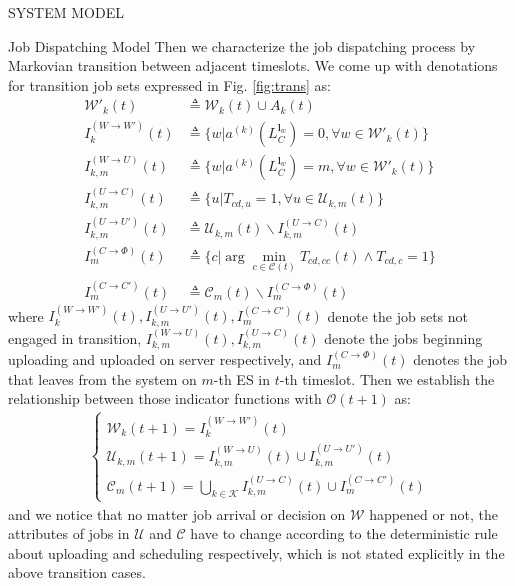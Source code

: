 \documentclass[10pt, conference, letterpaper]{IEEEtran}
\newcommand{\eq}{=}
\renewcommand{\vec}{\mathbf}
\newcommand{\apSet}{\mathcal{K}}
\newcommand{\wSet}{\mathcal{W}}
\newcommand{\uSet}{\mathcal{U}}
\newcommand{\cSet}{\mathcal{C}}
\begin{document}
\begin{section}{SYSTEM MODEL}
\begin{subsection}{Job Dispatching Model}
            Then we characterize the job dispatching process by Markovian transition between adjacent timeslots.
            We come up with denotations for transition job sets expressed in Fig. \ref{fig:trans} as:
            \begin{align}
                \wSet'_{k}(t) &\triangleq \wSet_{k}(t) \cup A_k(t)
                \\
                I^{(W \to W')}_{k}(t) & \triangleq \{ w | a^{(k)}(L_C^{\vec{l}_w})\eq0, \forall w \in \wSet'_{k}(t) \}
                \\
                I^{(W \to U)}_{k,m}(t) &\triangleq \{ w | a^{(k)}(L_C^{\vec{l}_w})=m, \forall w \in \wSet'_{k}(t) \}
                \\
                I^{(U \to C)}_{k,m}(t) &\triangleq \{ u | T_{cd,u}=1, \forall u \in \uSet_{k,m}(t)\}
                \\
                I^{(U \to U')}_{k,m}(t) &\triangleq \uSet_{k,m}(t) \backslash I^{(U \to C)}_{k,m}(t)
                \\
                I^{(C \to \Phi)}_{m}(t) &\triangleq \{ c | \arg\min_{c\in\cSet(t)} T_{cd,cc}(t) \wedge T_{cd,c}=1\}
                \\
                I^{(C \to C')}_{m}(t) &\triangleq \cSet_{m}(t) \backslash I^{(C \to \Phi)}_{m}(t)
            \end{align}
            where $I^{(W \to W')}_{k}(t), I^{(U \to U')}_{k,m}(t), I^{(C \to C')}_{m}(t)$ denote the job sets not engaged in transition, $I^{(W \to U)}_{k,m}(t), I^{(U \to C)}_{k,m}(t)$ denote the jobs beginning uploading and uploaded on server respectively, and $I^{(C \to \Phi)}_{m}(t)$ denotes the job that leaves from the system on $m$-th ES in $t$-th timeslot.
            Then we establish the relationship between those indicator functions with $\mathcal{O}(t+1)$ as:
            \begin{align}
                \begin{cases}
                    \wSet_{k}(t+1) = I^{(W \to W')}_{k}(t)
                    \\
                    \uSet_{k,m}(t+1) = I^{(W \to U)}_{k,m}(t) \cup I^{(U \to U')}_{k,m}(t)
                    \\
                    \cSet_{m}(t+1) = \bigcup\limits_{k\in\apSet} I^{(U \to C)}_{k,m}(t) \cup I^{(C \to C')}_{m}(t)
                \end{cases}
            \end{align}
            and we notice that no matter job arrival or decision on $\wSet$ happened or not, the attributes of jobs in $\uSet$ and $\cSet$ have to change according to the deterministic rule about uploading and scheduling respectively, which is not stated explicitly in the above transition cases.


\end{subsection}
\end{section}
\end{document}
